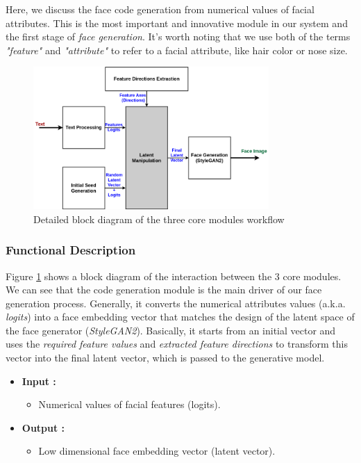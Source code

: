 Here, we discuss the face code generation from numerical values of facial attributes. This is the most important and innovative module in our system and the first stage of \emph{face generation}. It's worth noting that we use both of the terms \emph{"feature"} and \emph{"attribute"} to refer to a facial attribute, like hair color or nose size.

\begin{figure}[H]
    \centering
    \includegraphics[width=0.8\textwidth]{images/face-gen-arch.png}
    \caption{Detailed block diagram of the three core modules workflow}
    \label{fig:face_gen}
\end{figure}

\subsubsection{Functional Description}

Figure \ref{fig:face_gen} shows a block diagram of the interaction between the $3$ core modules. We can see that the code generation module is the main driver of our face generation process. Generally, it converts the numerical attributes values (a.k.a. \emph{logits}) into a face embedding vector that matches the design of the latent space of the face generator (\emph{StyleGAN2}). Basically, it starts from an initial vector and uses the \emph{required feature values} and \emph{extracted feature directions} to transform this vector into the final latent vector, which is passed to the generative model.

\begin{itemize}
    \item \textbf{Input :}
    \begin{itemize}
        \item Numerical values of facial features (logits).
    \end{itemize}
    \item \textbf{Output :}
    \begin{itemize}
        \item Low dimensional face embedding vector (latent vector).
    \end{itemize}
\end{itemize}

